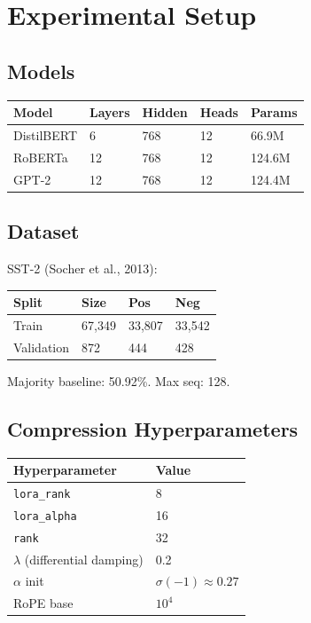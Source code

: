 \section{Experimental Setup}

\subsection{Models}

\begin{table}[H]
\centering
\small
\begin{tabular}{lllll}
\toprule
\textbf{Model} & \textbf{Layers} & \textbf{Hidden} & \textbf{Heads} & \textbf{Params} \\
\midrule
DistilBERT & 6 & 768 & 12 & 66.9M \\
RoBERTa & 12 & 768 & 12 & 124.6M \\
GPT-2 & 12 & 768 & 12 & 124.4M \\
\bottomrule
\end{tabular}
\end{table}

\subsection{Dataset}

SST-2 (Socher et al., 2013):

\begin{table}[H]
\centering
\small
\begin{tabular}{llll}
\toprule
\textbf{Split} & \textbf{Size} & \textbf{Pos} & \textbf{Neg} \\
\midrule
Train & 67,349 & 33,807 & 33,542 \\
Validation & 872 & 444 & 428 \\
\bottomrule
\end{tabular}
\end{table}

Majority baseline: 50.92\%. Max seq: 128.

\subsection{Compression Hyperparameters}

\begin{table}[H]
\centering
\small
\begin{tabular}{ll}
\toprule
\textbf{Hyperparameter} & \textbf{Value} \\
\midrule
\texttt{lora\_rank} & 8 \\
\texttt{lora\_alpha} & 16 \\
\texttt{rank} & 32 \\
$\lambda$ (differential damping) & 0.2 \\
$\alpha$ init & $\sigma(-1) \approx 0.27$ \\
RoPE base & $10^4$ \\
\bottomrule
\end{tabular}
\end{table}

